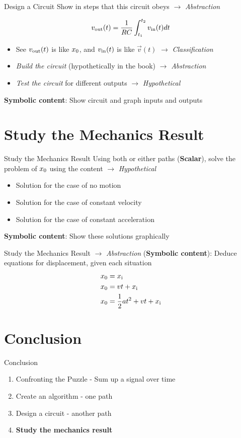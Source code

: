 \documentclass{beamer}
\begin{document}
\begin{frame}{Design a Circuit}
Show in steps that this circuit obeys $\to$ \textit{\alert{Abstraction}} \\ \vspace{0.25cm}
\begin{tcolorbox}
\begin{equation}
v_{\rm out} (t) = \frac{1}{RC} \int_{t_1}^{t_2} v_{\rm in}(t) dt
\end{equation}
\end{tcolorbox}
\begin{itemize}
\item See $v_{\rm out}(t)$ is like $x_{\rm 0}$, and $v_{\rm in}(t)$ is like $\vec{v}(t)$ $\to$ \textit{\alert{Classification}}
\item \textit{Build the circuit} (hypothetically in the book) $\to$ \textit{\alert{Abstraction}}
\item \textit{Test the circuit} for different outputs $\to$ \textit{\alert{Hypothetical}}
\end{itemize}
\alert{\textbf{Symbolic content}}: Show circuit and graph inputs and outputs
\end{frame}

\section{Study the Mechanics Result}

\begin{frame}{Study the Mechanics Result}
Using both or either paths (\textbf{Scalar}), solve the problem of $x_{\rm 0}$ using the content $\to$ \textit{\alert{Hypothetical}}
\begin{itemize}
\item Solution for the case of no motion
\item Solution for the case of constant velocity
\item Solution for the case of constant acceleration
\end{itemize}
\alert{\textbf{Symbolic content}}: Show these solutions graphically
\end{frame}

\begin{frame}{Study the Mechanics Result}
$\to$ \textit{\alert{Abstraction}} (\alert{\textbf{Symbolic content}}): Deduce equations for displacement, given each situation \\
\begin{align}
x_{\rm 0} &= x_{\rm i} \\
x_{\rm 0} &= vt + x_{\rm i} \\
x_{\rm 0} &= \frac{1}{2}at^2 + vt + x_{\rm i} 
\end{align}
\end{frame}

\section{Conclusion}

\begin{frame}{Conclusion}
\begin{enumerate}
\small
\item Confronting the Puzzle - Sum up a signal over time
\item Create an algorithm - one path
\item Design a circuit - another path
\item \textbf{\alert{Study the mechanics result}}
\end{enumerate}
\end{frame}
\end{document}
